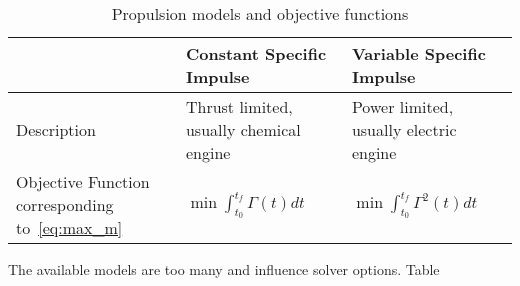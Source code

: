 \begin{table}[]
    \centering
    \begin{tabular}{p{5cm}p{5cm}p{5cm}} \toprule
        & \textbf{Constant Specific Impulse} & \textbf{Variable Specific Impulse} \\ \midrule
        Description & Thrust limited, usually chemical engine & Power limited, usually electric engine \\
        Objective Function corresponding to~\eqref{eq:max_m} & \(\min \int_{t_0}^{t_f} \Gamma(t) dt\) & \(\min \int_{t_0}^{t_f} \Gamma^2(t) dt\) \\ \bottomrule
    \end{tabular}
    \caption{Propulsion models and objective functions}
    \label{tab:prop_models}
\end{table}

The available models are too many and influence solver options. Table~%


